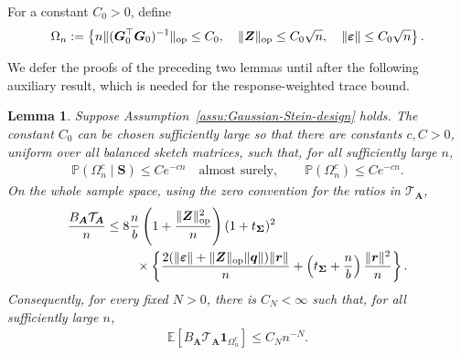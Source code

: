 \documentclass{article}
\theoremstyle{plain}
\newtheorem{lemma}[theorem]{Lemma}
\theoremstyle{definition}
\theoremstyle{definition}
\DeclarePairedDelimiter\norm{\lVert}{\rVert}
\def\E{{\mathbb{E}}}
\def\P{{\mathbb{P}}}
\def\mathbold{\boldsymbol}
\def\cal{\mathcal}
\def\bA{\mathbold{A}}\def\calA{{\cal A}}\def\scrA{{\mathscr A}}\def\Ahat{\widehat{A}}\def\Atil{{\widetilde A}}
\def\bG{\mathbold{G}}\def\calG{{\cal G}}\def\scrG{{\mathscr G}}\def\Ghat{\widehat{G}}\def\Gtil{{\widetilde G}}
\def\bq{\mathbold{q}}\def\qhat{\widehat{q}}\def\qtil{\widetilde{q}}\def\qbar{{\overline q}}
\def\br{\mathbold{r}}\def\rhat{\widehat{r}}\def\rtil{\widetilde{r}}\def\rbar{{\overline r}}
\def\bS{\mathbold{S}}\def\hbS{{\widehat{\bS}}}\def\tbS{{\widetilde{\bS}}}
\def\bZ{\mathbold{Z}}\def\hbZ{{\widehat{\bZ}}}\def\tbZ{{\widetilde{\bZ}}}
\def\ep{\varepsilon}\def\eps{\epsilon}\def\veps{\varepsilon}
\def\bep{ {\mathbold{\ep} }}
\def\bSigma{\mathbold{\Sigma}}\def\hbSigma{{\widehat{\bSigma}}}
\begin{document}
For a constant $C_0>0$, define
\begin{align*}
    \Omega_n:=\left\{
       n\norm{(\bG_0^\top\bG_0)^{-1}}_{\rm op}\leq C_0,\quad
       \norm{\bZ}_{\rm op}\leq C_0\sqrt n,\quad
       \norm{\bep}\leq C_0\sqrt n
    \right\}.
\end{align*}

We defer the proofs of the preceding two lemmas until after the following
auxiliary result, which is needed for the response-weighted trace bound.

\begin{lemma}
\label{lem:balanced-exceptional-weight}
Suppose Assumption~\ref{assu:Gaussian-Stein-design} holds.  The constant
$C_0$ can be chosen
sufficiently large so that there are constants $c,C>0$, uniform over all
balanced sketch matrices,
such that, for all sufficiently large $n$,
\begin{align}
    \P(\Omega_n^c\mid\bS)\leq Ce^{-cn}\quad\text{almost surely},
    \qquad
    \P(\Omega_n^c)\leq Ce^{-cn}.
    \label{eq:balanced-exceptional-tail}
\end{align}
On the whole sample space, using the zero convention for the ratios in
$\mathcal T_{\bA}$,
\begin{align}
    \frac{B_{\bA}\mathcal T_{\bA}}{n}
    \leq{}&8\frac nb
       \left(1+\frac{\norm{\bZ}_{\rm op}^2}{n}\right)
       (1+t_{\bSigma})^2\notag\\
       &\quad\times\left\{
       \frac{2(\norm{\bep}+\norm{\bZ}_{\rm op}\norm{\bq})\norm{\br}}{n}
       +\left(t_{\bSigma}+\frac nb\right)\frac{\norm{\br}^2}{n}
       \right\}.
    \label{eq:balanced-explicit-BT-polynomial}
\end{align}
Consequently, for every fixed $N>0$, there is $C_N<\infty$ such that, for all
sufficiently large $n$,
\begin{align}
    \E\left[
       B_{\bA}\mathcal T_{\bA}\boldsymbol{1}_{\Omega_n^c}
    \right]
    \leq C_Nn^{-N}.
    \label{eq:balanced-exceptional-BT}
\end{align}
\end{lemma}
\end{document}
